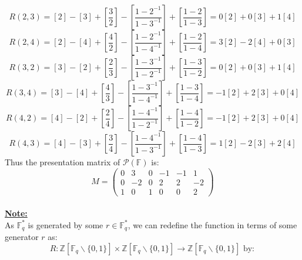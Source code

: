 \documentclass[11pt]{article}
\theoremstyle{plain}
\theoremstyle{definition}
\begin{document}
\begin{equation*}
R(2,3) = [2] - [3] + [\frac{3}{2}] - [\frac{1-2^{-1}}{1-3^{-1}}] + [\frac{1-2}{1-3}] = 0[2] + 0[3] + 1[4]
\end{equation*}
\begin{equation*}
R(2,4) = [2] - [4] + [\frac{4}{2}] - [\frac{1-2^{-1}}{1-4^{-1}}] + [\frac{1-2}{1-4}] = 3[2] -2[4] + 0[3]
\end{equation*}
\begin{equation*}
R(3,2) = [3] - [2] + [\frac{2}{3}] - [\frac{1-3^{-1}}{1-2^{-1}}] + [\frac{1-3}{1-2}] = 0[2] + 0[3] + 1[4] 
\end{equation*}
\begin{equation*}
R(3,4) = [3] - [4] + [\frac{4}{3}] - [\frac{1-3^{-1}}{1-4^{-1}}] + [\frac{1-3}{1-4}] = -1[2] + 2[3] + 0[4]
\end{equation*}
\begin{equation*}
R(4,2) = [4] - [2] + [\frac{2}{4}] - [\frac{1-4^{-1}}{1-2^{-1}}] + [\frac{1-4}{1-2}] = -1[2] + 2[3] + 0[4]
\end{equation*}
\begin{equation*}
R(4,3) = [4] - [3] + [\frac{3}{4}] - [\frac{1-4^{-1}}{1-3^{-1}}] + [\frac{1-4}{1-3}] = 1[2] -2[3] +2[4] 
\end{equation*}
Thus the presentation matrix of $\mathcal{P}(\mathbb{F})$ is:
\[ M = \left( \begin{array}{cccccc}
0 &3&0&-1&-1&1 \\
0&-2&0&2&2&-2\\
1&0&1&0&0&2  
\end{array}\right) \]
\\
\textbf{\underline{Note:}}\\ As $\mathbb{F}_{q} ^{*}$ is generated by some $r \in \mathbb{F}_{q} ^{*}$, we can redefine the function in terms of some generator $r$ as:\\
\begin{equation*}
R:  \mathbb{Z} [\mathbb{F}_{q}  \backslash \{0,1\} ] \times \mathbb{Z} [\mathbb{F}_{q}  \backslash \{0,1\} ]  \rightarrow \mathbb{Z} [\mathbb{F}_{q}  \backslash \{0,1\} ]  \text{ by}:
\end{equation*}
\end{document}
